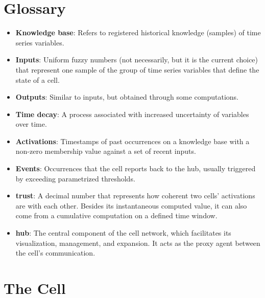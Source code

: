 \section{Glossary} \label{sec:glossary}


\begin{itemize}
    \item \textbf{Knowledge base}: Refers to registered historical knowledge (samples) of time series variables.

    \item \textbf{Inputs}: Uniform fuzzy numbers (not necessarily, but it is the current choice) that represent one sample of the group of time series variables that define the state of a cell.

    \item \textbf{Outputs}: Similar to inputs, but obtained through some computations.

    \item \textbf{Time decay}: A process associated with increased uncertainty of variables over time.

    \item \textbf{Activations}: Timestamps of past occurrences on a knowledge base with a non-zero membership value against a set of recent inputs.

    \item \textbf{Events}: Occurrences that the cell reports back to the hub, usually triggered by exceeding parametrized thresholds.

    \item \textbf{trust}: A decimal number that represents how coherent two cells' activations are with each other. Besides its instantaneous computed value, it can also come from a cumulative computation on a defined time window.

    \item \textbf{hub}: The central component of the cell network, which facilitates its visualization, management, and expansion. It acts as the proxy agent between the cell's communication.

\end{itemize}

\section{The Cell} \label{sec:thecell}


